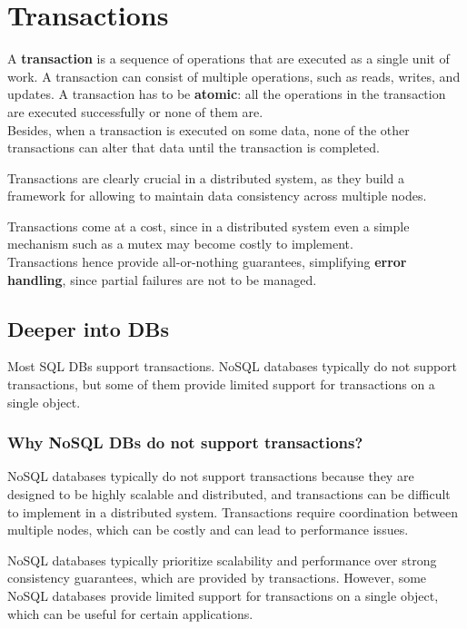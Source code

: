 \chapter{Transactions}

\begin{definition}
   [Transaction]
   A \textbf{transaction} is a sequence of operations that are executed as a single unit of work. A transaction can consist of multiple operations, such as reads, writes, and updates.
   A transaction has to be \textbf{atomic}: all the operations in the transaction are executed successfully or none of them are.\\
   Besides, when a transaction is executed on some data, none of the other transactions can alter that data until the transaction is completed.
\end{definition}

Transactions are clearly crucial in a distributed system, as they build a framework for allowing to maintain data consistency across multiple nodes.



Transactions come at a cost, since in a distributed system even a simple mechanism such as a mutex may become costly to implement.\\
Transactions hence provide all-or-nothing guarantees, simplifying \textbf{error handling}, since partial failures are not to be managed.




\section{Deeper into DBs}

Most SQL DBs support transactions.
NoSQL databases typically do not support transactions, but some of them provide limited support for transactions on a single object.
\subsection{Why NoSQL DBs do not support transactions?}
NoSQL databases typically do not support transactions because they are designed to be highly scalable and distributed,
and transactions can be difficult to implement in a distributed system.
Transactions require coordination between multiple nodes, which can be costly and can lead to performance issues.

NoSQL databases typically prioritize scalability and performance over strong consistency guarantees, which are provided by transactions.
However, some NoSQL databases provide limited support for transactions on a single object, which can be useful for certain applications.



